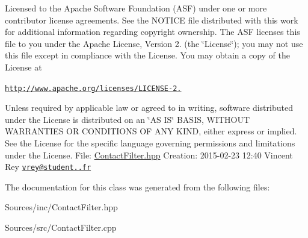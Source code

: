Licensed to the Apache Software Foundation (A\-S\-F) under one or more contributor license agreements. See the N\-O\-T\-I\-C\-E file distributed with this work for additional information regarding copyright ownership. The A\-S\-F licenses this file to you under the Apache License, Version 2. (the \char`\"{}\-License\char`\"{}); you may not use this file except in compliance with the License. You may obtain a copy of the License at

\href{http://www.apache.org/licenses/LICENSE-2.0}{\tt http\-://www.\-apache.\-org/licenses/\-L\-I\-C\-E\-N\-S\-E-\/2.}

Unless required by applicable law or agreed to in writing, software distributed under the License is distributed on an \char`\"{}\-A\-S I\-S\char`\"{} B\-A\-S\-I\-S, W\-I\-T\-H\-O\-U\-T W\-A\-R\-R\-A\-N\-T\-I\-E\-S O\-R C\-O\-N\-D\-I\-T\-I\-O\-N\-S O\-F A\-N\-Y K\-I\-N\-D, either express or implied. See the License for the specific language governing permissions and limitations under the License. File\-: \hyperlink{_contact_filter_8hpp_source}{Contact\-Filter.\-hpp} Creation\-: 2015-\/02-\/23 12\-:40 Vincent Rey \href{mailto:vrey@student.42.fr}{\tt vrey@student..\-fr} 

The documentation for this class was generated from the following files\-:\begin{DoxyCompactItemize}
\item 
Sources/inc/Contact\-Filter.\-hpp\item 
Sources/src/Contact\-Filter.\-cpp\end{DoxyCompactItemize}

